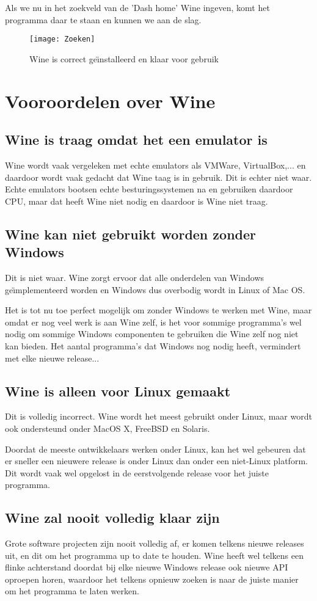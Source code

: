 \documentclass[12pt]{article}
\begin{document}
Als we nu in het zoekveld van de 'Dash home' Wine ingeven, komt het programma daar te staan en kunnen we aan de slag.
\begin{figure} [!ht]
\begin{center}
	\texttt{[image: Zoeken]}
\end{center}
	\caption{Wine is correct ge\"{\i}nstalleerd en klaar voor gebruik}
\end{figure}
\newpage
\section{Vooroordelen over Wine}
\subsection{Wine is traag omdat het een emulator is}
Wine wordt vaak vergeleken met echte emulators als VMWare, VirtualBox,... en daardoor wordt vaak gedacht dat Wine taag is in gebruik. Dit is echter niet waar. Echte emulators bootsen echte besturingssystemen na en gebruiken daardoor CPU, maar dat heeft Wine niet nodig en daardoor is Wine niet traag.
\subsection{Wine kan niet gebruikt worden zonder Windows}
Dit is niet waar. Wine zorgt ervoor dat alle onderdelen van Windows ge\"{\i}mplementeerd worden en Windows dus overbodig wordt in Linux of Mac OS. 

Het is tot nu toe perfect mogelijk om zonder Windows te werken met Wine, maar omdat er nog veel werk is aan Wine zelf, is het voor sommige programma's wel nodig om sommige Windows componenten te gebruiken die Wine zelf nog niet kan bieden. Het aantal programma's dat Windows nog nodig heeft, vermindert met elke nieuwe release...
\subsection{Wine is alleen voor Linux gemaakt}
Dit is volledig incorrect. Wine wordt het meest gebruikt onder Linux, maar wordt ook ondersteund onder MacOS X, FreeBSD en Solaris.

Doordat de meeste ontwikkelaars werken onder Linux, kan het wel gebeuren dat er sneller een nieuwere release is onder Linux dan onder een niet-Linux platform. Dit wordt vaak wel opgelost in de eerstvolgende release voor het juiste programma. 
\subsection{Wine zal nooit volledig klaar zijn}
Grote software projecten zijn nooit volledig af, er komen telkens nieuwe releases uit, en dit om \cite{Wikipedia} het programma up to date te houden. Wine heeft wel telkens een flinke achterstand doordat bij elke nieuwe Windows release ook nieuwe API oproepen horen, waardoor het telkens opnieuw zoeken is naar de juiste manier om het programma te laten werken.
\end{document}
